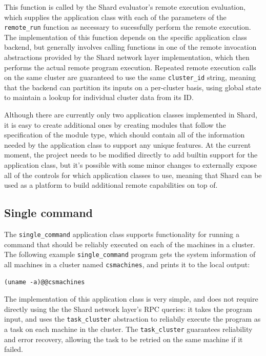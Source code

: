 \documentclass[twoside]{report}
\begin{document}
This function is called by the Shard evaluator's remote execution evaluation, which supplies the application class with each of the parameters of the \texttt{remote\_run} function as necessary to sucessfully perform the remote execution.
The implementation of this function depends on the specific application class backend, but generally involves calling functions in one of the remote invocation abstractions provided by the Shard network layer implementation, which then performs the actual remote program execution.
Repeated remote execution calls on the same cluster are guaranteed to use the same \texttt{cluster\_id} string, meaning that the backend can partition its inputs on a per-cluster basis, using global state to maintain a lookup for individual cluster data from its ID.

Although there are currently only two application classes implemented in Shard, it is easy to create additional ones by creating modules that follow the specification of the module type, which should contain all of the information needed by the application class to support any unique features.
At the current moment, the project needs to be modified directly to add builtin support for the application class, but it's possible with some minor changes to externally expose all of the controls for which application classes to use, meaning that Shard can be used as a platform to build additional remote capabilities on top of.

\subsection{Single command}

\begin{sloppypar}
  The \texttt{single\_command} application class supports functionality for running a command that should be reliably executed on each of the machines in a cluster. The following example \texttt{single\_command} program gets the system information of all machines in a cluster named \texttt{csmachines}, and prints it to the local output:
\end{sloppypar}

\begin{minipage}[c]{\textwidth-15pt}
  \begin{lstlisting}
(uname -a)@@csmachines 
\end{lstlisting}
  \smallskip
\end{minipage}

\begin{sloppypar}
  The implementation of this application class is very simple, and does not require directly using the the Shard network layer's RPC queries: it takes the program input, and uses the \texttt{task\_cluster} abstraction to reliabily execute the program as a task on each machine in the cluster.
  The \texttt{task\_cluster} guarantees reliability and error recovery, allowing the task to be retried on the same machine if it failed.
\end{sloppypar}
\end{document}
